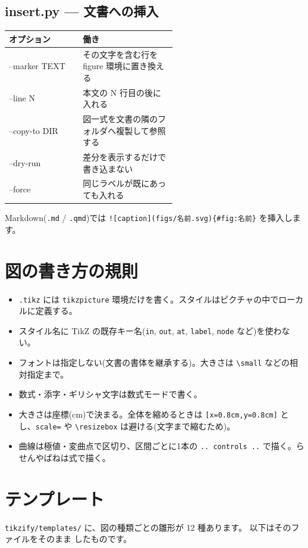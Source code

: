 \documentclass[a4paper,11pt]{ltjsarticle}
\newcommand{\cmd}[1]{\texttt{#1}}
\begin{document}
\subsection{insert.py --- 文書への挿入}
\begin{tabular}{>{\ttfamily}l p{0.56\linewidth}}
\toprule
\normalfont オプション & 働き \\ \midrule
--marker TEXT & その文字を含む行を figure 環境に置き換える \\
--line N & 本文の N 行目の後に入れる \\
--copy-to DIR & 図一式を文書の隣のフォルダへ複製して参照する \\
--dry-run & 差分を表示するだけで書き込まない \\
--force & 同じラベルが既にあっても入れる \\
\bottomrule
\end{tabular}

\noindent Markdown(\texttt{.md} / \texttt{.qmd})では \verb|![caption](figs/名前.svg){#fig:名前}| を挿入します。

\section{図の書き方の規則}
\begin{itemize}
\item \texttt{.tikz} には \verb|tikzpicture| 環境だけを書く。スタイルはピクチャの中でローカルに定義する。
\item スタイル名に TikZ の既存キー名(\texttt{in}, \texttt{out}, \texttt{at}, \texttt{label}, \texttt{node} など)を使わない。
\item フォントは指定しない(文書の書体を継承する)。大きさは \verb|\small| などの相対指定まで。
\item 数式・添字・ギリシャ文字は数式モードで書く。
\item 大きさは座標(cm)で決まる。全体を縮めるときは \verb|[x=0.8cm,y=0.8cm]| とし、\verb|scale=| や \verb|\resizebox| は避ける(文字まで縮むため)。
\item 曲線は極値・変曲点で区切り、区間ごとに1本の \verb|.. controls ..| で描く。らせんやばねは式で描く。
\end{itemize}

\section{テンプレート}
\cmd{tikzify/templates/} に、図の種類ごとの雛形が 12 種あります。
以下はそのファイルをそのまま \verb|| したものです。
\end{document}
